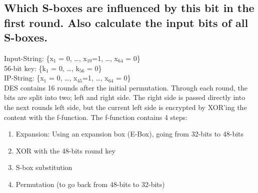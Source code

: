 \subsection{Which S-boxes are influenced by this bit in the first round. Also calculate the input bits of all S-boxes.}
\label{section:3a}
Input-String: \{x$_{1}$ = 0, \ldots, x$_{19}$=1, \ldots, x$_{64}$ = 0\} \\
56-bit key: \{k$_{1}$ = 0, \ldots, k$_{56}$ = 0\} \\
IP-String: \{x$_{1}$ = 0, \ldots, x$_{45}$=1, \ldots, x$_{64}$ = 0\} \\
\vspace{1em}\newline
DES contains 16 rounds after the initial permutation. 
Through each round, the bits are split into two; left and right side. 
The right side is passed directly into the next rounds left side, but the current left side is encrypted by XOR'ing the content with the f-function.
The f-function contains 4 steps:
\begin{enumerate}
	\item Expansion: Using an expansion box (E-Box), going from 32-bits to 48-bits
	\item XOR with the 48-bits round key
	\item S-box substitution
	\item Permutation (to go back from 48-bits to 32-bits)
\end{enumerate}

